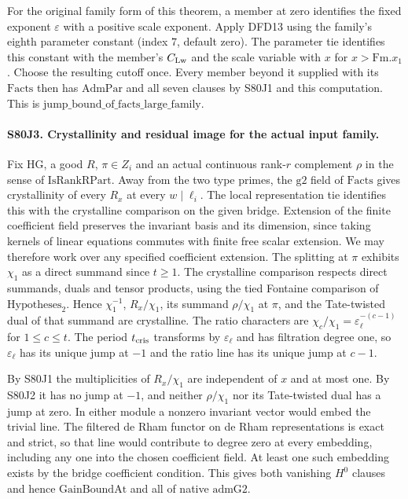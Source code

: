 For the original family form of this theorem, a member at zero
identifies the fixed exponent $\varepsilon$ with a positive scale
exponent. Apply DFD13 using the family's eighth parameter constant
(index $7$, default zero). The parameter tie identifies this constant
with the member's $C_{\rm Lw}$ and the scale variable with $x$ for
$x>\mathrm{Fm}.x_1$. Choose the resulting cutoff once. Every member
beyond it supplied with its $\mathrm{Facts}$ then has $\mathrm{AdmPar}$
and all seven clauses by S80J1 and this computation. This is
$\mathrm{jump\_bound\_of\_facts\_large\_family}$.

\paragraph{S80J3. Crystallinity and residual image for the actual input family.}
Fix $\mathrm{HG}$, a good $R$, $\pi\in Z_i$ and an actual continuous
rank-$r$ complement $\rho$ in the sense of $\mathrm{IsRankRPart}$.
Away from the two type primes, the $\mathrm{g2}$ field of
$\mathrm{Facts}$ gives crystallinity of every $R_x$ at every
$w\mid\ell_i$. The local representation tie identifies this with the
crystalline comparison on the given bridge. Extension of the finite
coefficient field preserves the invariant basis and its dimension,
since taking kernels of linear equations commutes with finite free
scalar extension. We may therefore work over any specified coefficient
extension. The splitting at $\pi$ exhibits $\chi_1$ as a direct
summand since $t\ge1$. The crystalline comparison respects direct
summands, duals and tensor products, using the tied Fontaine
comparison of $\mathrm{Hypotheses}_2$. Hence $\chi_1^{-1}$,
$R_x/\chi_1$, its summand $\rho/\chi_1$ at $\pi$, and the
Tate-twisted dual of that summand are crystalline. The ratio characters
are $\chi_c/\chi_1=\varepsilon_\ell^{-(c-1)}$ for $1\le c\le t$.
The period $t_{\rm cris}$ transforms by $\varepsilon_\ell$ and has
filtration degree one, so $\varepsilon_\ell$ has its unique jump at
$-1$ and the ratio line has its unique jump at $c-1$.

By S80J1 the multiplicities of $R_x/\chi_1$ are independent of $x$
and at most one. By S80J2 it has no jump at $-1$, and neither
$\rho/\chi_1$ nor its Tate-twisted dual has a jump at zero. In either
module a nonzero invariant vector would embed the trivial line.
The filtered de Rham functor on de Rham representations is exact
and strict, so that line would contribute to degree zero at every
embedding, including any one into the chosen coefficient field.
At least one such embedding exists by the bridge coefficient
condition. This gives both vanishing $H^0$ clauses and hence
$\mathrm{GainBoundAt}$ and all of native $\mathrm{admG2}$.


